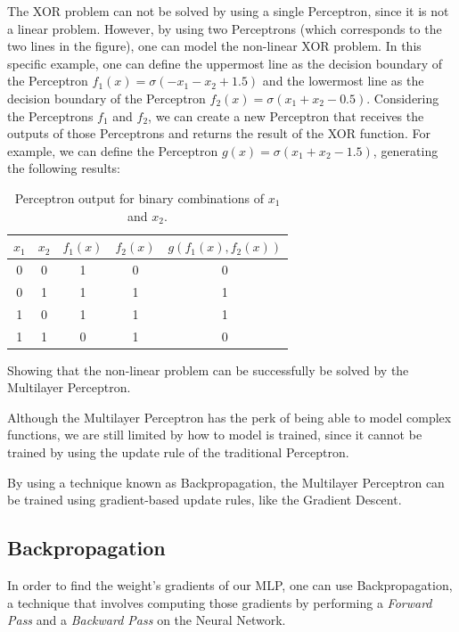 The XOR problem can not be solved by using a single Perceptron, since it is not a linear problem.
However, by using two Perceptrons (which corresponds to the two lines in the figure), one can model the non-linear XOR problem.  
In this specific example, one can define the uppermost line as the decision boundary of the Perceptron \(f_1(x) = \sigma(- x_1 - x_2 + 1.5)\) and the lowermost line as the decision boundary of the Perceptron \(f_2(x) = \sigma(x_1 + x_2 - 0.5)\).
Considering the Perceptrons \(f_1\) and \(f_2\), we can create a new Perceptron that receives the outputs of those Perceptrons and returns the result of the XOR function. 
For example, we can define the Perceptron \(g(x) = \sigma(x_1 + x_2 - 1.5)\), generating the following results:
\begin{table}[h!]
    \centering
    \begin{tabular}{|c|c|c|c|c|}
    \hline
    $x_1$ & $x_2$ & $f_1(x)$ & $f_2(x)$ & $g(f_1(x), f_2(x))$ \\ \hline
    0     & 0     & 1     & 0     & 0   \\ \hline
    0     & 1     & 1     & 1     & 1   \\ \hline
    1     & 0     & 1     & 1     & 1   \\ \hline
    1     & 1     & 0     & 1     & 0   \\ \hline
    \end{tabular}
    \caption{Perceptron output for binary combinations of \(x_1\) and \(x_2\).}
    \label{tab:xor_table}
\end{table}

\noindent Showing that the non-linear problem can be successfully be solved by the Multilayer Perceptron.

Although the Multilayer Perceptron has the perk of being able to model complex functions, we are still limited by how to model is trained, since it cannot be trained by using the update rule of the traditional Perceptron.

By using a technique known as Backpropagation, the Multilayer Perceptron can be trained using gradient-based update rules, like the Gradient Descent.

\subsection{Backpropagation}

In order to find the weight's gradients of our MLP, one can use Backpropagation, a technique that involves computing those gradients by performing a \emph{Forward Pass} and a \emph{Backward Pass} on the Neural Network.

